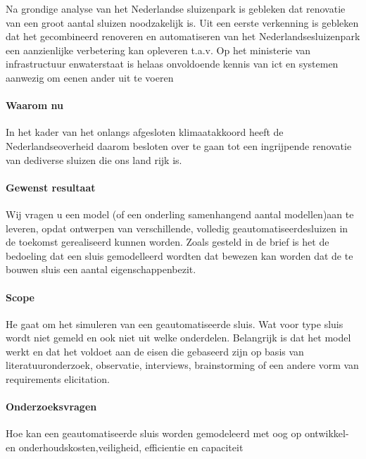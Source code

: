 Na grondige analyse van het Nederlandse sluizenpark is gebleken dat renovatie van een groot aantal sluizen noodzakelijk is.  Uit een eerste verkenning is gebleken  dat het gecombineerd renoveren en automatiseren van het Nederlandsesluizenpark een aanzienlijke verbetering kan opleveren t.a.v. 
Op  het  ministerie  van  infrastructuur  enwaterstaat is helaas onvoldoende kennis van ict en systemen aanwezig om eenen ander uit te voeren 

\paragraph{Waarom nu}
In  het  kader  van  het  onlangs  afgesloten  klimaatakkoord  heeft  de  Nederlandseoverheid  daarom  besloten  over  te  gaan  tot  een  ingrijpende  renovatie  van  dediverse  sluizen  die  ons  land  rijk  is.     

\paragraph{Gewenst resultaat }


Wij vragen u een model (of een onderling samenhangend aantal modellen)aan  te  leveren,  opdat  ontwerpen  van  verschillende,  volledig  geautomatiseerdesluizen in de toekomst gerealiseerd kunnen worden. 
Zoals  gesteld  in  de  brief  is  het  de  bedoeling  dat  een  sluis  gemodelleerd  wordten  dat  bewezen  kan  worden  dat  de  te  bouwen  sluis  een  aantal  eigenschappenbezit.  

\paragraph{Scope}

He gaat om het simuleren van een geautomatiseerde sluis. Wat voor type sluis wordt niet gemeld en ook niet uit welke onderdelen. Belangrijk is dat het model werkt en dat het voldoet aan de eisen die gebaseerd zijn op basis van literatuuronderzoek, observatie, interviews, brainstorming of een andere vorm van requirements elicitation.

\paragraph{Onderzoeksvragen }

Hoe kan een geautomatiseerde sluis worden gemodeleerd met oog op ontwikkel- en onderhoudskosten,veiligheid, efficientie en capaciteit





